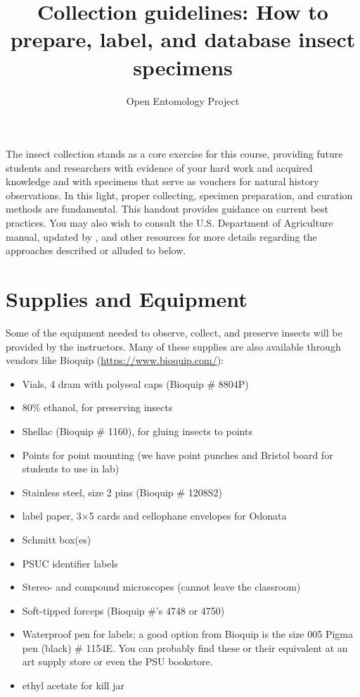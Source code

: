 \documentclass[letterpaper, 11pt]{article}
\title{Collection guidelines: How to prepare, label, and database insect specimens}
\author{Open Entomology Project}
\begin{document}
\cleanlookdateon %
\maketitle
\thispagestyle{fancy}

The insect collection stands as a core exercise for this course, providing future students and researchers with evidence of your hard work and acquired knowledge and with specimens that serve as vouchers for natural history observations. In this light, proper collecting, specimen preparation, and curation methods are fundamental. This handout provides guidance on current best practices. You may also wish to consult the U.S. Department of Agriculture manual, updated by \cite{USDAmanual}, and other resources for more details regarding the approaches described or alluded to below. 

\section*{Supplies and Equipment}
Some of the equipment needed to observe, collect, and preserve insects will be provided by the instructors. Many of these supplies are also available through vendors like Bioquip (\url{https://www.bioquip.com/}):

\begin{itemize}
\item Vials, 4 dram with polyseal caps (Bioquip \# 8804P)
\item 80\% ethanol, for preserving insects
\item Shellac (Bioquip \# 1160), for gluing insects to points
\item Points for point mounting (we have point punches and Bristol board for students to use in lab)
\item Stainless steel, size 2 pins (Bioquip \# 1208S2)
\item label paper, 3$\times$5 cards and cellophane envelopes for Odonata
\item Schmitt box(es)
\item PSUC identifier labels
\item Stereo- and compound microscopes (cannot leave the classroom)
\item Soft-tipped forceps (Bioquip \#'s 4748 or 4750)
\item Waterproof pen for labels; a good option from Bioquip is the size 005 Pigma pen (black) \# 1154E. You can probably find these or their equivalent at an art supply store or even the PSU bookstore.
\item ethyl acetate for kill jar
\end{itemize}
\end{document}
